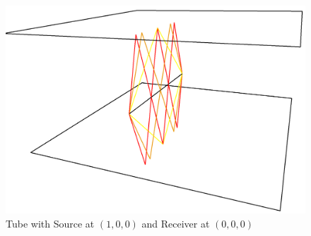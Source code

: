 \begin{figure}[H]
    \begin{center}
    \includegraphics[width=\textwidth]{figures/experiments/tube_100.png}
    \end{center}
    \caption[Tube with Source at $(1,0,0)$ and Receiver at $(0,0,0)$]{Tube with Source at $(1,0,0)$ and Receiver at $(0,0,0)$}
    \label{fig:tube}
\end{figure}

